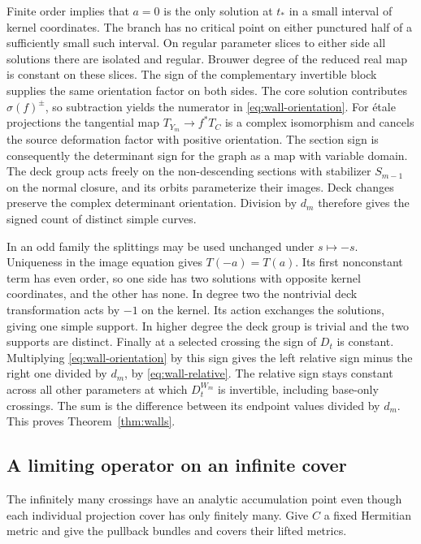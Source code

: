 Finite order implies that $a=0$ is the only solution at $t_*$ in a
small interval of kernel coordinates. The branch has no critical
point on either punctured half of a sufficiently small such interval.
On regular parameter slices to either side all solutions there are
isolated and regular. Brouwer degree of the reduced real map is
constant on these slices. The sign of the complementary invertible
block supplies the same orientation factor on both sides. The core
solution contributes $\sigma(f)^\pm$, so subtraction yields the
numerator in \eqref{eq:wall-orientation}. For \'etale projections the
tangential map $T_{Y_m}\to f^*T_C$ is a complex isomorphism and
cancels the source deformation factor with positive orientation. The
section sign is consequently the determinant sign for the graph as
a map with variable domain. The deck group acts freely on the
non-descending sections with stabilizer $S_{m-1}$ on the normal
closure, and its orbits parameterize their images. Deck changes
preserve the complex determinant orientation. Division by $d_m$
therefore gives the signed count of distinct simple curves.

In an odd family the splittings may be used unchanged under $s\mapsto
-s$. Uniqueness in the image equation gives $T(-a)=T(a)$. Its first
nonconstant term has even order, so one side has two solutions with
opposite kernel coordinates, and the other has none. In degree two
the nontrivial deck transformation acts by $-1$ on the kernel. Its
action exchanges the solutions, giving one simple support. In higher
degree the deck group is trivial and the two supports are distinct.
Finally at a selected crossing the sign of $D_t$ is constant.
Multiplying \eqref{eq:wall-orientation} by this sign gives the
left relative sign minus the right one divided by $d_m$, by
\eqref{eq:wall-relative}. The relative sign stays constant across
all other parameters at which $D_t^{W_m}$ is invertible, including
base-only crossings. The sum is the difference between its endpoint
values divided by $d_m$. This proves Theorem~\ref{thm:walls}.

\subsection*{A limiting operator on an infinite cover}
The infinitely many crossings have an analytic accumulation point even
though each individual projection cover has only finitely many. Give
$C$ a fixed Hermitian metric and give the pullback bundles and covers
their lifted metrics.

